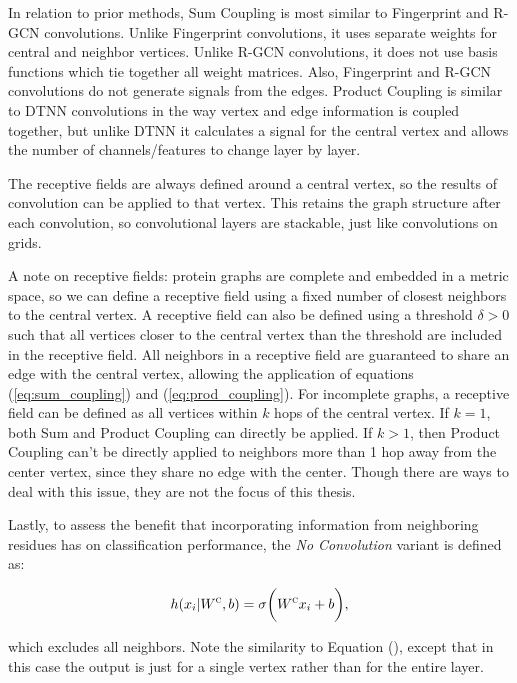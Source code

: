 In relation to prior methods, Sum Coupling is most similar to Fingerprint and R-GCN convolutions.
Unlike Fingerprint convolutions, it uses separate weights for central and neighbor vertices.
Unlike R-GCN convolutions, it does not use basis functions which tie together all weight matrices.
Also, Fingerprint and R-GCN convolutions do not generate signals from the edges.
Product Coupling is similar to DTNN convolutions in the way vertex and edge information is coupled together, but unlike DTNN it calculates a signal for the central vertex and allows the number of channels/features to change layer by layer. 

The receptive fields are always defined around a central vertex, so the results of convolution can be applied to that vertex.
This retains the graph structure after each convolution, so convolutional layers are stackable, just like convolutions on grids.

A note on receptive fields: protein graphs are complete and embedded in a metric space, so we can define a receptive field using a fixed number of closest neighbors to the central vertex.
A receptive field can also be defined using a threshold $\delta>0$ such that all vertices closer to the central vertex than the threshold are included in the receptive field.
All neighbors in a receptive field are guaranteed to share an edge with the central vertex, allowing the application of equations (\ref{eq:sum_coupling}) and (\ref{eq:prod_coupling}).
For incomplete graphs, a receptive field can be defined as all vertices within $k$ hops of the central vertex. 
If $k=1$, both Sum and Product Coupling can directly be applied.
If $k>1$, then Product Coupling can't be directly applied to neighbors more than 1 hop away from the center vertex, since they share no edge with the center. 
Though there are ways to deal with this issue, they are not the focus of this thesis.

Lastly, to assess the benefit that incorporating information from neighboring residues has on classification performance, the \emph{No Convolution} variant is defined as:

\begin{equation}
h(x_i | W^\textsc{c}, b)= \sigma \bigg( W^{\textsc{c}} x_i + b \bigg),
\label{eq:no_conv}
\end{equation}

\noindent
which excludes all neighbors.
Note the similarity to Equation (), except that in this case the output is just for a single vertex rather than for the entire layer.


